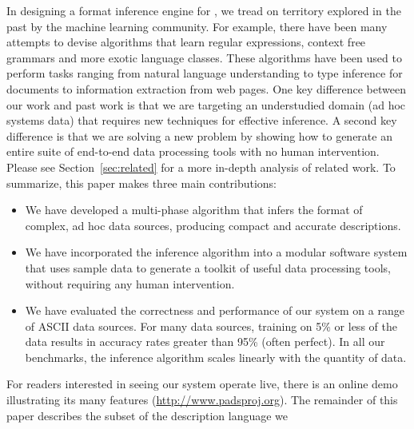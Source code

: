 In designing a format inference engine for \pads{}, we tread on
territory explored in the past by the machine learning community.  For
example, there have been many attempts to devise algorithms that learn
regular expressions, context free grammars and more exotic language
classes.  These algorithms have been used to perform tasks ranging
from natural language understanding to type inference for \xml{}
documents to information extraction from web pages.  One key
difference between our work and past work is that we are targeting an
understudied domain (ad hoc systems data) that requires new techniques for
effective inference.  A second key difference is that we are solving a
new problem by showing how to generate an entire suite of end-to-end
data processing tools with no human intervention.  Please see
Section~\ref{sec:related} for a more in-depth analysis of related
work.  To summarize, this paper makes three main contributions:
\begin{itemize}
\item We have developed a multi-phase algorithm 
that infers the format of complex, ad hoc data sources,
producing compact and accurate \pads{} descriptions.  

\item We have incorporated the inference algorithm into 
a modular software system that uses sample data to
generate a toolkit of useful data processing tools,
without requiring any human intervention.
 
\item We have evaluated the correctness and performance of
our system on a range of ASCII data sources.  For many data
sources, training on 5\% or less of the data results in
accuracy rates greater than 95\% (often perfect).  
In all our benchmarks, the 
inference algorithm scales linearly with the quantity of
data.
\end{itemize}
\noindent
For readers interested in seeing our system operate live, 
there is an online demo illustrating its many features
(\url{http://www.padsproj.org}).  The remainder of this paper
describes the subset of the \pads{} description language we
